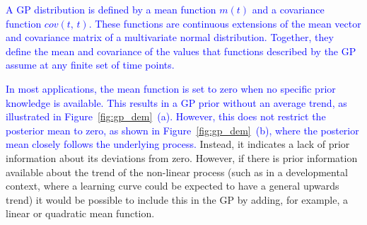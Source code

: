 \documentclass[man, floatsintext]{apa7}
\begin{document}
\begin{sidewaysfigure*}[htbp]
  \caption{Demonstration of a Gaussian process regression}
  \label{fig:gp_dem}
\end{sidewaysfigure*}

\textcolor{blue}{
  A GP distribution is defined by a mean function $m(t)$ and a covariance
  function $cov(t, \, t)$. These functions are continuous extensions of the
  mean vector and covariance matrix of a multivariate normal distribution.
  Together, they define the mean and covariance of the values that functions
  described by the GP assume at any finite set of time points.
}

\textcolor{blue}{
  In most applications, the mean function is set to zero when no specific prior
  knowledge is available. This results in a GP prior without an average trend,
  as illustrated in Figure~\ref{fig:gp_dem}~(a). However, this does not
  restrict the posterior mean to zero, as shown in Figure~\ref{fig:gp_dem}~(b),
  where the posterior mean closely follows the underlying process. } Instead,
it indicates a lack of prior information about its deviations from zero.
However, if there is prior information available about the trend of the
non-linear process (such as in a developmental context, where a learning
curve could be expected to have a general upwards trend) it would be possible
to include this in the GP by adding, for example, a linear or quadratic mean
function.
\end{document}
